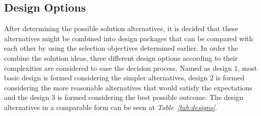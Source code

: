 \documentclass[a4paper,12pt]{article}
\begin{document}
\begin{table}[H]
\begin{tabular}{| c | c  c  c |}
       
       \\\hline
      
  \end{tabular}
  \label{tab:solns}
\end{table}				
	
	
	\subsection{Design Options}
	
	After determining the possible solution alternatives, it is decided that these alternatives might be combined into design packages that can be compared with each other by using the selection objectives determined earlier.  In order the combine the solution ideas, three different design options according to their complexities are considered to ease the decision process. Named as design 1, most basic design is formed considering the simpler alternatives, design 2 is formed considering the more reasonable alternatives that would satisfy the expectations and the design 3 is formed considering the best possible outcome. The design alternatives in a comparable form can be seen at \textit{Table~\ref{tab:designs}}. 
	
\end{document}
